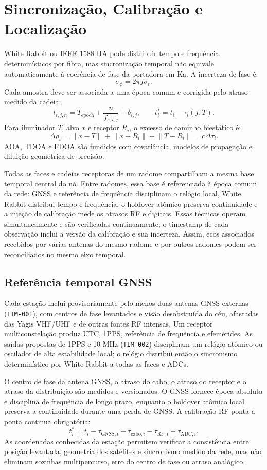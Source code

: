 \chapter{Sincronização, Calibração e Localização}

White Rabbit ou IEEE 1588 HA pode distribuir tempo e frequência determinísticos por fibra, mas sincronização temporal não equivale automaticamente à coerência de fase da portadora em Ka. A incerteza de fase é:
\[
\sigma_\phi=2\pi f\sigma_t.
\]
Cada amostra deve ser associada a uma época comum e corrigida pelo atraso medido da cadeia:
\[
t_{i,j,n}=T_{\mathrm{epoch}}+\frac{n}{f_{s,i,j}}+\delta_{i,j},\qquad t_i^\ast=t_i-\tau_i(f,T).
\]
Para iluminador $T$, alvo $x$ e receptor $R_i$, o excesso de caminho biestático é:
\[
\Delta\rho_i=\lVert x-T\rVert+\lVert x-R_i\rVert-\lVert T-R_i\rVert=c\Delta\tau_i.
\]
AOA, TDOA e FDOA são fundidos com covariância, modelos de propagação e diluição geométrica de precisão.

Todas as faces e cadeias receptoras de um radome compartilham a mesma base temporal central do nó. Entre radomes, essa base é referenciada à época comum da rede: GNSS e referência de frequência disciplinam o relógio local, White Rabbit distribui tempo e frequência, o holdover atômico preserva continuidade e a injeção de calibração mede os atrasos RF e digitais. Essas técnicas operam simultaneamente e são verificadas continuamente; o timestamp de cada observação inclui a versão da calibração e sua incerteza. Assim, ecos associados recebidos por várias antenas do mesmo radome e por outros radomes podem ser reconciliados no mesmo eixo temporal.

\section{Referência temporal GNSS}
Cada estação inclui provisoriamente pelo menos duas antenas GNSS externas (\texttt{TIM-001}), com centros de fase levantados e visão desobstruída do céu, afastadas das Yagis VHF/UHF e de outras fontes RF intensas. Um receptor multiconstelação produz UTC, 1PPS, referência de frequência e efemérides. As saídas propostas de 1PPS e 10 MHz (\texttt{TIM-002}) disciplinam um relógio atômico ou oscilador de alta estabilidade local; o relógio distribui então o sincronismo determinístico por White Rabbit a todas as faces e ADCs.

O centro de fase da antena GNSS, o atraso do cabo, o atraso do receptor e o atraso da distribuição são medidos e versionados. O GNSS fornece época absoluta e disciplina de frequência de longo prazo, enquanto o holdover atômico local preserva a continuidade durante uma perda de GNSS. A calibração RF ponta a ponta continua obrigatória:
\[
t_i^\ast=t_i-\tau_{\mathrm{GNSS},i}-\tau_{\mathrm{cabo},i}-\tau_{\mathrm{RF},i}-\tau_{\mathrm{ADC},i}.
\]
As coordenadas conhecidas da estação permitem verificar a consistência entre posição levantada, geometria dos satélites e sincronismo medido da rede, mas não eliminam sozinhas multipercurso, erro do centro de fase ou atraso analógico.

